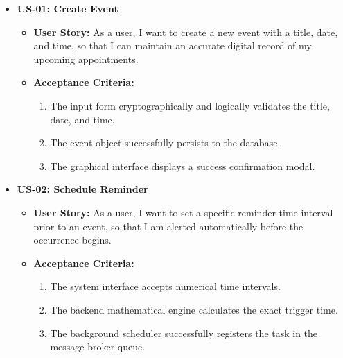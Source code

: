 \begin{itemize}
    \item \textbf{US-01: Create Event}
          \begin{itemize}
              \item \textbf{User Story:} As a user, I want to create a new event with a title, date, and time, so that I can maintain an accurate digital record of my upcoming appointments.
              \item \textbf{Acceptance Criteria:}
                    \begin{enumerate}
                        \item The input form cryptographically and logically validates the title, date, and time.
                        \item The event object successfully persists to the database.
                        \item The graphical interface displays a success confirmation modal.
                    \end{enumerate}
          \end{itemize}

    \item \textbf{US-02: Schedule Reminder}
          \begin{itemize}
              \item \textbf{User Story:} As a user, I want to set a specific reminder time interval prior to an event, so that I am alerted automatically before the occurrence begins.
              \item \textbf{Acceptance Criteria:}
                    \begin{enumerate}
                        \item The system interface accepts numerical time intervals.
                        \item The backend mathematical engine calculates the exact trigger time.
                        \item The background scheduler successfully registers the task in the message broker queue.
                    \end{enumerate}
          \end{itemize}


\end{itemize}
